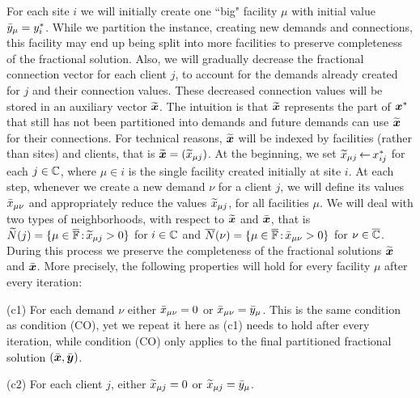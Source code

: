 \documentclass[11pt]{article}
\begin{document}
For each site $i$ we will initially create one ``big"
facility $\mu$ with initial value ${\bar y}_\mu = y^\ast_i$.
While we partition the instance, creating new demands and
connections, this facility may end up being split into more
facilities to preserve completeness of the fractional
solution. Also, we will gradually decrease the fractional
connection vector for each client $j$, to account for the
demands already created for $j$ and their connection values.  These
decreased connection values will be stored in an auxiliary
vector $\widetilde{\boldsymbol{x}}$. The intuition is that $\widetilde{\boldsymbol{x}}$
represents the part of $\boldsymbol{x}^\ast$ that still has not been
partitioned into demands and future demands can use
$\widetilde{\boldsymbol{x}}$ for their connections. For technical reasons,
$\widetilde{\boldsymbol{x}}$ will be indexed by facilities (rather than
sites) and clients, that is $\widetilde{\boldsymbol{x}} = ({\widetilde x}_{\mu j})$.
At the beginning, we set ${\widetilde x}_{\mu j}{\,\leftarrow\,}
x_{ij}^\ast$ for each $j\in\mathbb{C}$, where $\mu\in i$ is
the single facility created initially at site $i$.  At each
step, whenever we create a new demand $\nu$ for a client
$j$, we will define its values ${\bar x}_{\mu\nu}$ and
appropriately reduce the values ${\widetilde x}_{\mu j}$, for all
facilities $\mu$. We will deal with two types of
neighborhoods, with respect to $\widetilde{\boldsymbol{x}}$ and $\bar{\boldsymbol{x}}$,
that is ${\widetilde N}(j)=\{\mu\in\overline{\mathbb{F}}
{\,:\,}{\widetilde x}_{\mu j} > 0\}$ for $i\in\mathbb{C}$ and
${\overline{N}}(\nu)=\{\mu\in\overline{\mathbb{F}} {\,:\,} {\bar x}_{\mu\nu}
>0\}$ for $\nu\in\overline{\mathbb{C}}$.  During this process we
preserve the completeness of the fractional solutions
$\widetilde{\boldsymbol{x}}$ and $\bar{\boldsymbol{x}}$. More precisely, the following
properties will hold for every facility $\mu$ after every
iteration:
%
\begin{description}
	
	\item{(c1)} For each demand $\nu$ either ${\bar x}_{\mu\nu}=0$ or
			${\bar x}_{\mu\nu}={\bar y}_{\mu}$. This is the same
      condition as condition (CO), yet we repeat it here as
      (c1) needs to hold after every iteration, while
      condition (CO) only applies to the final partitioned
      fractional solution $(\bar{\boldsymbol{x}}, \bar{\boldsymbol{y}})$.

	\item{(c2)} For each client $j$,
			either ${\widetilde x}_{\mu j}=0$ or ${\widetilde x}_{\mu j}={\bar y}_{\mu}$.
			
\end{description}
\end{document}
